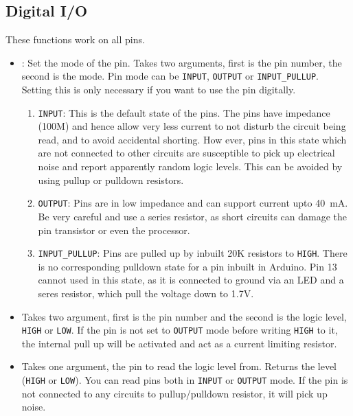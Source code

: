 \documentclass{article}
\begin{document}
	\subsection{Digital I/O}

		These functions work on all pins.

		\begin{itemize}

			\item {}: Set the mode of the pin. Takes two arguments, first is the pin number, the second is the mode. Pin mode can be \texttt{INPUT}, \texttt{OUTPUT} or \texttt{INPUT\_PULLUP}. Setting this is only necessary if you want to use the pin digitally.
			\begin{enumerate}
				
				\item[] \texttt{INPUT}: This is the default state of the pins. The pins have impedance (100M) and hence allow very less current to not disturb the circuit being read, and to avoid accidental shorting. How ever, pins in this state which are not connected to other circuits are susceptible to pick up electrical noise and report apparently random logic levels. This can be avoided by using pullup or pulldown resistors.

				\item[] \texttt{OUTPUT}: Pins are in low impedance and can support current upto 40~mA. Be very careful and use a series resistor, as short circuits can damage the pin transistor or even the processor.

				\item[] \texttt{INPUT\_PULLUP}: Pins are  pulled up by inbuilt 20K resistors to \texttt{HIGH}. There is no corresponding pulldown state for a pin inbuilt in Arduino. Pin 13 cannot used in this state, as it is connected to ground via an LED and a seres resistor, which pull the voltage down to 1.7V. 

			\end{enumerate}

			\item {} Takes two argument, first is the pin number and the second is the logic level, \texttt{HIGH} or \texttt{LOW}. If the pin is not set to \texttt{OUTPUT} mode before writing \texttt{HIGH} to it, the internal pull up will be activated and act as a current limiting resistor.
			\item {} Takes one argument, the pin to read the logic level from. Returns the level (\texttt{HIGH} or \texttt{LOW}). You can read pins both in \texttt{INPUT} or \texttt{OUTPUT} mode. If the pin is not connected to any circuits to pullup/pulldown resistor, it will pick up noise.

		\end{itemize}
\end{document}
